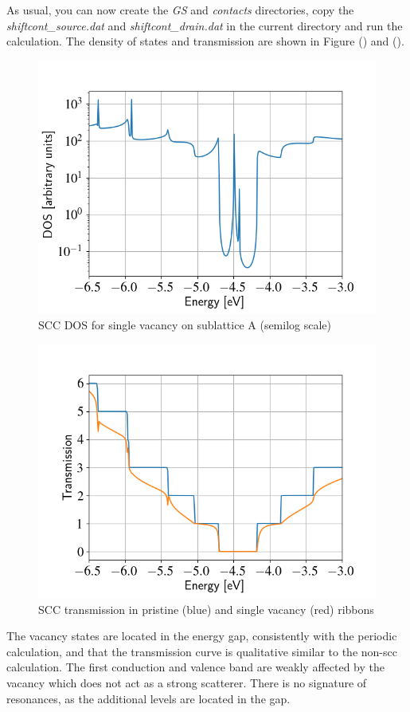 \documentclass[a4paper,11pt,english]{sphinxmanual}
\begin{document}
{{As usual, you can now create the \emph{GS} and \emph{contacts} directories, copy
the \emph{shiftcont\_source.dat} and \emph{shiftcont\_drain.dat} in the current
directory and run the calculation.  The density of states and
transmission are shown in Figure {\hyperref[transport:fig-scc-vac-dos]{\emph{}}} () and
{\hyperref[transport:fig-scc-vac-tunn]{\emph{}}} ().
\begin{figure}[htbp]
\centering
\capstart
\includegraphics[width=0.700\linewidth]{scc-vac-dos.png}
\caption{SCC DOS for single vacancy on sublattice A (semilog scale)}\label{transport:fig-scc-vac-dos}\end{figure}
\begin{figure}[htbp]
\centering
\capstart
\includegraphics[width=0.700\linewidth]{scc-vac-tunn.png}
\caption{SCC transmission in pristine (blue) and single vacancy (red) ribbons}\label{transport:fig-scc-vac-tunn}\end{figure}

The vacancy states are located in the energy gap, consistently with
the periodic calculation, and that the transmission curve is qualitative
similar to the non-scc calculation. The first conduction and valence
band are weakly affected by the vacancy which does not act as a strong
scatterer. There is no signature of resonances, as the additional
levels are located in the gap.

}}
\end{document}
